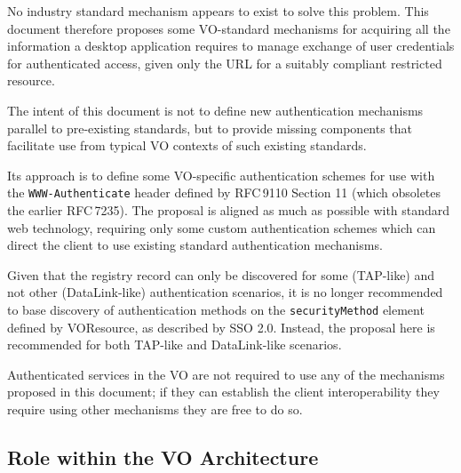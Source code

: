 \documentclass[11pt,a4paper]{ivoa}
\newcommand{\rfc}[1]{RFC\,#1}
\newcommand{\header}[1]{{\tt #1}}
\begin{document}
No industry standard mechanism appears to exist to solve this problem.
This document therefore proposes some VO-standard mechanisms for
acquiring all the information a desktop application requires
to manage exchange of user credentials for authenticated access,
given only the URL for a suitably compliant restricted resource.

The intent of this document is not to define new authentication
mechanisms parallel to pre-existing standards, but to provide
missing components that facilitate use from typical VO contexts
of such existing standards.

Its approach is to define some VO-specific authentication schemes
for use with the \header{WWW-Authenticate} header defined by
\rfc{9110} Section 11 (which obsoletes the earlier \rfc{7235}).
The proposal is aligned as much as possible with standard web
technology, requiring only some custom authentication schemes
which can direct the client to use existing standard authentication
mechanisms.

Given that the registry record can only be discovered for some
(TAP-like) and not other (DataLink-like) authentication scenarios,
it is no longer recommended to base discovery of authentication methods
on the {\tt securityMethod} element
defined by VOResource, as described by SSO 2.0.
Instead, the proposal here is recommended for both TAP-like and DataLink-like
scenarios.

Authenticated services in the VO are not required to use any of the  
mechanisms proposed in this document; if they can establish the
client interoperability they require using other mechanisms
they are free to do so.

\subsection{Role within the VO Architecture}
\end{document}
